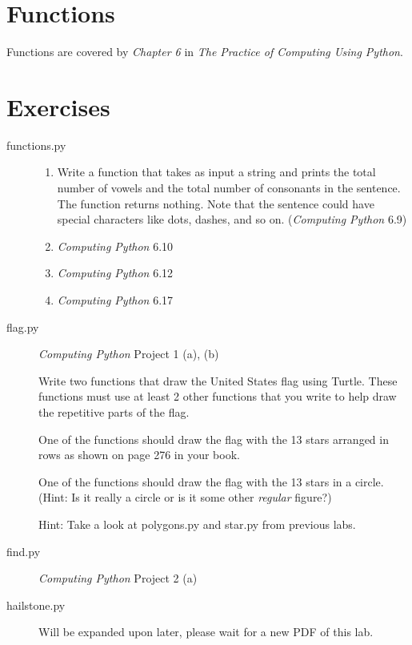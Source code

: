 \documentclass[11pt]{cselabheader}
\begin{document}
\section{Functions}

Functions are covered by \emph{Chapter 6} in \emph{The Practice of Computing
Using Python}.

\section{Exercises}
\label{sec:ex}

\begin{description}
  \item[functions.py] \hfill
    
    \begin{enumerate}
      \item Write a function that takes as input a string and prints the total
        number of vowels and the total number of consonants in the sentence. The
        function returns nothing. Note that the sentence could have special
        characters like dots, dashes, and so on. (\emph{Computing Python} 6.9)

      \item \emph{Computing Python} 6.10
      \item \emph{Computing Python} 6.12

      \item \emph{Computing Python} 6.17
    \end{enumerate}

  \item[flag.py] \emph{Computing Python} Project 1 (a), (b) \hfill

    Write two functions that draw the United States flag using Turtle.
    These functions must use at least 2 other functions that you write
    to help draw the repetitive parts of the flag.

    One of the functions should draw the flag with the 13 stars arranged
    in rows as shown on page 276 in your book.

    One of the functions should draw the flag with the 13 stars in a circle.
    (Hint: Is it really a circle or is it some other \emph{regular} figure?)
    
    Hint: Take a look at polygons.py and star.py from previous labs.

  \item[find.py] \emph{Computing Python} Project 2 (a)

  \item[hailstone.py] Will be expanded upon later, please wait for a new PDF of
    this lab.
\end{description} 
\end{document}
